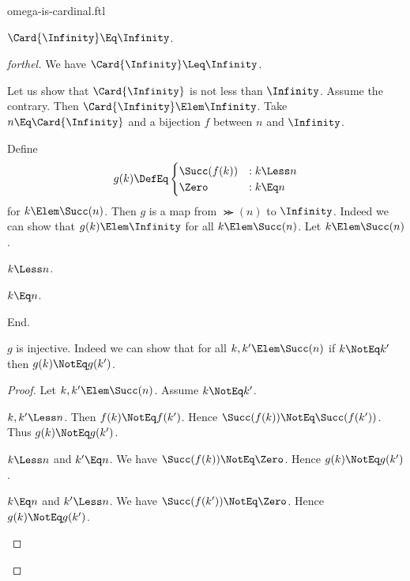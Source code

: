 \documentclass{stex}
\begin{document}
\begin{smodule}{omega-is-cardinal.ftl}


\begin{proposition*}[forthel]
  $\Card{\Infinity} \Eq \Infinity$.
\end{proposition*}
\begin{proof}[forthel]
  We have $\Card{\Infinity} \Leq \Infinity$.

  Let us show that $\Card{\Infinity}$ is not less than $\Infinity$.
    Assume the contrary.
    Then $\Card{\Infinity} \Elem \Infinity$.
    Take $n \Eq \Card{\Infinity}$ and a bijection $f$ between $n$ and $\Infinity$.

    Define \[ g(k) \DefEq
      \begin{cases}
        \Succ(f(k)) & : k \Less n
        \\
        \Zero           & : k \Eq n
      \end{cases} \]
    for $k \Elem \Succ(n)$.
    Then $g$ is a map from $\Succ(n)$ to $\Infinity$.
    Indeed we can show that $g(k) \Elem \Infinity$ for all $k \Elem \Succ(n)$.
      Let $k \Elem \Succ(n)$.
      \begin{case}{$k \Less n$.} \end{case}
      \begin{case}{$k \Eq n$.} \end{case}
    End.

    $g$ is injective.
    Indeed we can show that for all $k, k' \Elem \Succ(n)$ if $k \NotEq k'$
    then $g(k) \NotEq g(k')$. 
    \begin{proof}
      Let $k, k' \Elem \Succ(n)$.
      Assume $k \NotEq k'$.

      \begin{case}{$k, k' \Less n$.}
        Then $f(k) \NotEq f(k')$.
        Hence $\Succ(f(k)) \NotEq \Succ(f(k'))$.
        Thus $g(k) \NotEq g(k')$.
      \end{case}

      \begin{case}{$k \Less n$ and $k' \Eq n$.}
        We have $\Succ(f(k)) \NotEq \Zero$.
        Hence $g(k) \NotEq g(k')$.
      \end{case}

      \begin{case}{$k \Eq n$ and $k' \Less n$.}
        We have $\Succ(f(k')) \NotEq \Zero$.
        Hence $g(k) \NotEq g(k')$.
      \end{case}
    \end{proof}


\end{proof}
\end{smodule}
\end{document}
